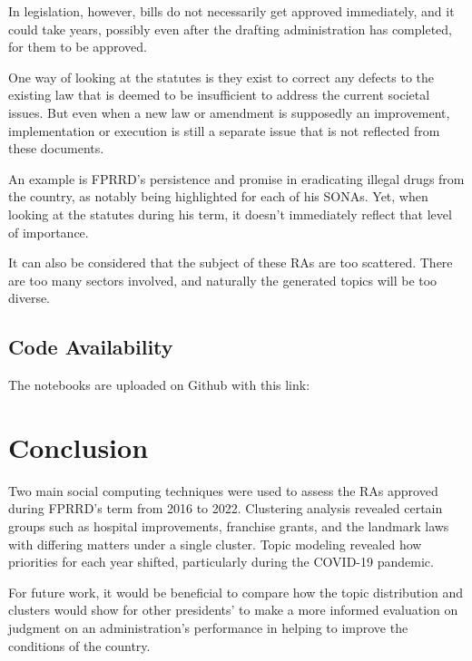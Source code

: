 \documentclass[conference]{IEEEtran}
\begin{document}
In legislation, however, bills do not necessarily get approved immediately, and it could take years, possibly even after the drafting administration has completed, for them to be approved.

One way of looking at the statutes is they exist to correct any defects to the existing law that is deemed to be insufficient to address the current societal issues. But even when a new law or amendment is supposedly an improvement, implementation or execution is still a separate issue that is not reflected from these documents.

An example is FPRRD's persistence and promise in eradicating illegal drugs from the country, as notably being highlighted for each of his SONAs. Yet, when looking at the statutes during his term, it doesn't immediately reflect that level of importance.

It can also be considered that the subject of these RAs are too scattered. There are too many sectors involved, and naturally the generated topics will be too diverse.

\subsection{Code Availability}\label{code_availability}

The notebooks are uploaded on Github with this link:

\section{Conclusion}

Two main social computing techniques were used to assess the RAs approved during FPRRD's term from 2016 to 2022. Clustering analysis revealed certain groups such as hospital improvements, franchise grants, and the landmark laws with differing matters under a single cluster. Topic modeling revealed how priorities for each year shifted, particularly during the COVID-19 pandemic.

For future work, it would be beneficial to compare how the topic distribution and clusters would show for other presidents' to make a more informed evaluation on judgment on an administration's performance in helping to improve the conditions of the country.
\end{document}
